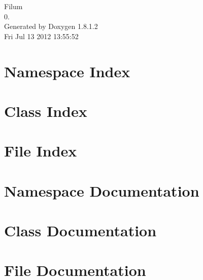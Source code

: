 \documentclass{book}
\begin{document}
\hypersetup{pageanchor=false,citecolor=blue}
\begin{titlepage}
\vspace*{7cm}
\begin{center}
{\Large Filum \\[1ex]\large 0. }\\
\vspace*{1cm}
{\large Generated by Doxygen 1.8.1.2}\\
\vspace*{0.5cm}
{\small Fri Jul 13 2012 13:55:52}\\
\end{center}
\end{titlepage}
\clearemptydoublepage
{}
\tableofcontents
\clearemptydoublepage
{}
\hypersetup{pageanchor=true,citecolor=blue}
\chapter{Namespace Index}

\chapter{Class Index}

\chapter{File Index}

\chapter{Namespace Documentation}



\chapter{Class Documentation}










\chapter{File Documentation}













\printindex
\end{document}
